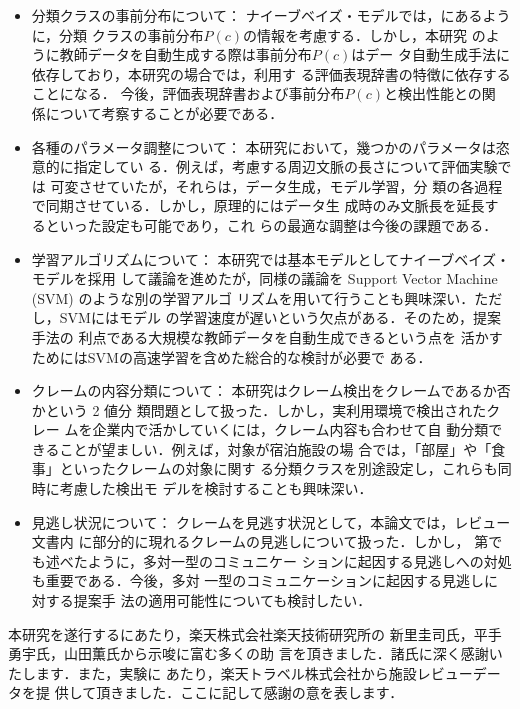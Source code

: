 \documentclass[japanese]{jnlp_1.4}
\def\sec#1{}
\def\eq#1{}
\begin{document}
\begin{itemize}
\item 分類クラスの事前分布について：
ナイーブベイズ・モデルでは，\eq{eq1}にあるように，分類
クラスの事前分布$P(c)$の情報を考慮する．しかし，本研究
のように教師データを自動生成する際は事前分布$P(c)$はデー
タ自動生成手法に依存しており，本研究の場合では，利用す
る評価表現辞書の特徴に依存することになる．
今後，評価表現辞書および事前分布$P(c)$と検出性能との関
係について考察することが必要である．

\item 各種のパラメータ調整について：
本研究において，幾つかのパラメータは恣意的に指定してい
る．例えば，考慮する周辺文脈の長さについて評価実験では
可変させていたが，それらは，データ生成，モデル学習，分
類の各過程で同期させている．しかし，原理的にはデータ生
成時のみ文脈長を延長するといった設定も可能であり，これ
らの最適な調整は今後の課題である．

\item 学習アルゴリズムについて：
本研究では基本モデルとしてナイーブベイズ・モデルを採用
して議論を進めたが，同様の議論を Support Vector
Machine (SVM) \cite{vapnik1995a} のような別の学習アルゴ
リズムを用いて行うことも興味深い．ただし，SVMにはモデル
の学習速度が遅いという欠点がある．そのため，提案手法の
利点である大規模な教師データを自動生成できるという点を
活かすためにはSVMの高速学習を含めた総合的な検討が必要で
ある．

\item クレームの内容分類について：
本研究はクレーム検出をクレームであるか否かという 2 値分
類問題として扱った．しかし，実利用環境で検出されたクレー
ムを企業内で活かしていくには，クレーム内容も合わせて自
動分類できることが望ましい．例えば，対象が宿泊施設の場
合では，「部屋」や「食事」といったクレームの対象に関す
る分類クラスを別途設定し，これらも同時に考慮した検出モ
デルを検討することも興味深い．

\item 見逃し状況について：
クレームを見逃す状況として，本論文では，レビュー文書内
に部分的に現れるクレームの見逃しについて扱った．しかし，
第\sec{hajimeni}でも述べたように，多対一型のコミュニケー
ションに起因する見逃しへの対処も重要である．今後，多対
一型のコミュニケーションに起因する見逃しに対する提案手
法の適用可能性についても検討したい．

\end{itemize}



\acknowledgment

本研究を遂行するにあたり，楽天株式会社楽天技術研究所の
新里圭司氏，平手勇宇氏，山田薫氏から示唆に富む多くの助
言を頂きました．諸氏に深く感謝いたします．また，実験に
あたり，楽天トラベル株式会社から施設レビューデータを提
供して頂きました．ここに記して感謝の意を表します．
\end{document}
